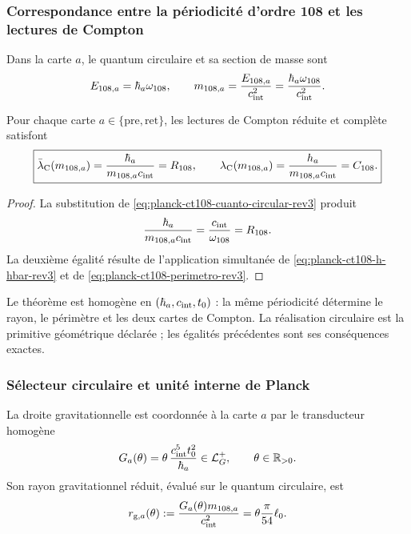\subsubsection{Correspondance entre la périodicité d’ordre 108 et les lectures de Compton}

Dans la carte \(a\), le quantum circulaire et sa section de masse sont
\begin{equation}
 E_{108,a}=\hbar_a\omega_{108},
 \qquad
 m_{108,a}=\frac{E_{108,a}}{c_{\rm int}^{2}}
 =\frac{\hbar_a\omega_{108}}{c_{\rm int}^{2}}.
 \label{eq:planck-ct108-cuanto-circular-rev3}
\end{equation}

\begin{theorem}
\label{thm:planck-ct108-compton-rev3}
Pour chaque carte \(a\in\{\mathrm{pre},\mathrm{ret}\}\), les lectures de
Compton réduite et complète satisfont
\begin{equation}
 \boxed{
 \bar\lambda_{\rm C}(m_{108,a})
 =\frac{\hbar_a}{m_{108,a}c_{\rm int}}=R_{108},
 \qquad
 \lambda_{\rm C}(m_{108,a})
 =\frac{h_a}{m_{108,a}c_{\rm int}}=C_{108}.}
 \label{eq:planck-ct108-identidad-compton-rev3}
\end{equation}
\end{theorem}

\begin{proof}
La substitution de
\eqref{eq:planck-ct108-cuanto-circular-rev3} produit
\[
 \frac{\hbar_a}{m_{108,a}c_{\rm int}}
 =\frac{c_{\rm int}}{\omega_{108}}=R_{108}.
\]
La deuxième égalité résulte de l’application simultanée de
\eqref{eq:planck-ct108-h-hbar-rev3} et de
\eqref{eq:planck-ct108-perimetro-rev3}.
\end{proof}

Le théorème est homogène en
\((\hbar_a,c_{\rm int},t_0)\) : la même périodicité détermine le rayon,
le périmètre et les deux cartes de Compton. La réalisation circulaire est la
primitive géométrique déclarée ; les égalités précédentes sont ses
conséquences exactes.

\subsubsection{Sélecteur circulaire et unité interne de Planck}

La droite gravitationnelle est coordonnée à la carte \(a\) par le transducteur
homogène
\begin{equation}
 G_a(\theta)=\theta\,
 \frac{c_{\rm int}^{5}t_0^2}{\hbar_a}
 \in\mathcal L_G^+,
 \qquad \theta\in\mathbb R_{>0}.
 \label{eq:planck-ct108-transductor-rev3}
\end{equation}
Son rayon gravitationnel réduit, évalué sur le quantum circulaire, est
\begin{equation}
 r_{{\rm g},a}(\theta)
 :=\frac{G_a(\theta)m_{108,a}}{c_{\rm int}^{2}}
 =\theta\frac{\pi}{54}\ell_0.
 \label{eq:planck-ct108-radio-gravitatorio-rev3}
\end{equation}

